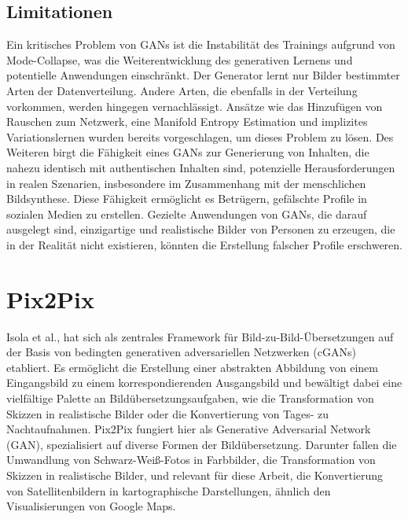 \subsection{Limitationen}
Ein kritisches Problem von GANs ist die Instabilität des Trainings aufgrund von Mode-Collapse, was die Weiterentwicklung des generativen Lernens und potentielle Anwendungen einschränkt\cite{Liu.2022}. Der Generator lernt nur Bilder bestimmter Arten der Datenverteilung.  Andere Arten, die ebenfalls in der Verteilung vorkommen, werden hingegen vernachlässigt\cite{Srivastava.2017}. Ansätze wie das Hinzufügen von Rauschen zum Netzwerk, eine Manifold Entropy Estimation \cite{Liu.2022} und implizites Variationslernen \cite{Srivastava.2017} wurden bereits vorgeschlagen, um dieses Problem zu lösen.
Des Weiteren birgt die Fähigkeit eines GANs zur Generierung von Inhalten, die nahezu identisch mit authentischen Inhalten sind, potenzielle Herausforderungen in realen Szenarien, insbesondere im Zusammenhang mit der menschlichen Bildsynthese. Diese Fähigkeit ermöglicht es Betrügern, gefälschte Profile in sozialen Medien zu erstellen. Gezielte Anwendungen von GANs, die darauf ausgelegt sind, einzigartige und realistische Bilder von Personen zu erzeugen, die in der Realität nicht existieren, könnten die Erstellung falscher Profile erschweren\cite{Aggarwal.2021}.


\section{Pix2Pix}
Isola et al., hat sich als zentrales Framework für Bild-zu-Bild-Übersetzungen auf der Basis von bedingten generativen adversariellen Netzwerken (cGANs) etabliert. Es ermöglicht die Erstellung einer abstrakten Abbildung von einem Eingangsbild zu einem korrespondierenden Ausgangsbild und bewältigt dabei eine vielfältige Palette an Bildübersetzungsaufgaben, wie die Transformation von Skizzen in realistische Bilder oder die Konvertierung von Tages- zu Nachtaufnahmen. \newline
Pix2Pix fungiert hier als Generative Adversarial Network (GAN), spezialisiert auf diverse Formen der Bildübersetzung. Darunter fallen die Umwandlung von Schwarz-Weiß-Fotos in Farbbilder, die Transformation von Skizzen in realistische Bilder, und relevant für diese Arbeit, die Konvertierung von Satellitenbildern in kartographische Darstellungen, ähnlich den Visualisierungen von Google Maps.
  



